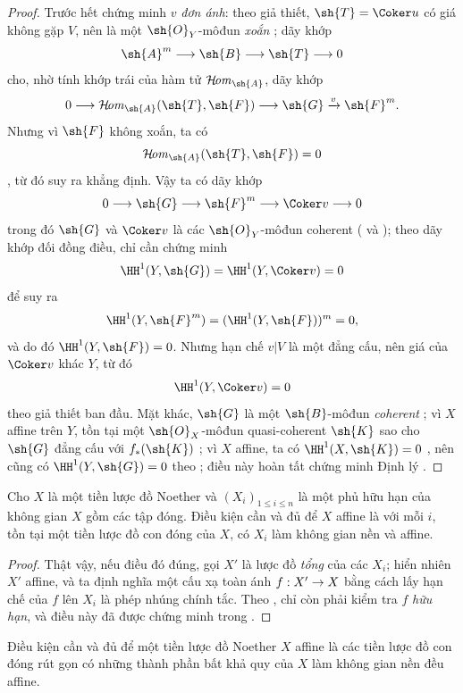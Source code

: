 \documentclass[oneside,10pt]{amsart}
\makeatletter
\renewcommand{\leq}{\leqslant}
\newcommand{\ega@arrow}[2]{\mathchoice{#1}{#2}{#2}{#2}}
\renewcommand{\to}{\ega@arrow{\longrightarrow}{\rightarrow}}
\def\shHom{\mathcal{H}\!\mathit{om}}
\newcommand{\oldpage}[2][]{\marginnote{\normalfont\footnotesize\textbf{#1}~|~#2}\ignorespaces}
\let\EGAOriginalLabel\label
\renewcommand{\label}[1]{\phantomsection\EGAOriginalLabel{#1}}
\makeatother
\begin{document}
\begin{proof}
Trước hết chứng minh $v$ \emph{đơn ánh}:
theo giả thiết, $\sh{T}=\Coker u$ có giá không gặp $V$, nên là một $\sh{O}_Y$-môđun \emph{xoắn} ;
dãy khớp
\[
  \sh{A}^m\to\sh{B}\to\sh{T}\to0
\]
cho, nhờ tính khớp trái của hàm tử $\shHom_{\sh{A}}$, dãy khớp
\[
  0\to\shHom_{\sh{A}}(\sh{T},\sh{F})
  \to\sh{G}\xrightarrow{v}\sh{F}^m.
\]
Nhưng vì $\sh{F}$ không xoắn, ta có
\[
  \shHom_{\sh{A}}(\sh{T},\sh{F})=0
\]
, từ đó suy ra khẳng định.
Vậy ta có dãy khớp
\[
  0\to\sh{G}\to\sh{F}^m\to\Coker v\to0
\]
\oldpage[II]{138}
trong đó $\sh{G}$ và $\Coker v$ là các $\sh{O}_Y$-môđun coherent ( và );
theo dãy khớp đối đồng điều, chỉ cần chứng minh
\[
  \HH^1(Y,\sh{G})=\HH^1(Y,\Coker v)=0
\]
để suy ra
\[
  \HH^1(Y,\sh{F}^m)=(\HH^1(Y,\sh{F}))^m=0,
\]
và do đó $\HH^1(Y,\sh{F})=0$.
Nhưng hạn chế $v|V$ là một đẳng cấu, nên giá của $\Coker v$ khác $Y$, từ đó
\[
  \HH^1(Y,\Coker v)=0
\]
theo giả thiết ban đầu.
Mặt khác, $\sh{G}$ là một $\sh{B}$-môđun \emph{coherent} ;
vì $X$ affine trên $Y$, tồn tại một $\sh{O}_X$-môđun quasi-coherent $\sh{K}$ sao cho $\sh{G}$ đẳng cấu với $f_*(\sh{K})$ ;
vì $X$ affine, ta có $\HH^1(X,\sh{K})=0$ , nên cũng có $\HH^1(Y,\sh{G})=0$ theo ; điều này hoàn tất chứng minh Định lý .
\end{proof}

\begin{corollary}[6.7.2]
\label{II.6.7.2}
Cho $X$ là một tiền lược đồ Noether và $(X_i)_{1\leq i\leq n}$ là một phủ hữu hạn của không gian $X$ gồm các tập đóng.
Điều kiện cần và đủ để $X$ affine là với mỗi $i$, tồn tại một tiền lược đồ con đóng của $X$, có $X_i$ làm không gian nền và affine.
\end{corollary}

\begin{proof}
Thật vậy, nếu điều đó đúng, gọi $X'$ là lược đồ \emph{tổng} của các $X_i$;
hiển nhiên $X'$ affine, và ta định nghĩa một cấu xạ toàn ánh $f:X'\to X$ bằng cách lấy hạn chế của $f$ lên $X_i$ là phép nhúng chính tắc.
Theo , chỉ còn phải kiểm tra $f$ \emph{hữu hạn}, và điều này đã được chứng minh trong .
\end{proof}

\begin{corollary}[6.7.3]
\label{II.6.7.3}
Điều kiện cần và đủ để một tiền lược đồ Noether $X$ affine là các tiền lược đồ con đóng rút gọn có những thành phần bất khả quy của $X$ làm không gian nền đều affine.
\end{corollary}
\end{document}
